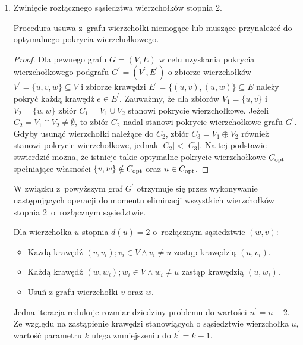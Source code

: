 \begin{enumerate}
  \item Zwinięcie rozłącznego sąsiedztwa wierzchołków stopnia 2.
    \begin{theorem}
      Procedura usuwa z~grafu wierzchołki niemogące lub muszące przynależeć do 
      optymalnego pokrycia wierzchołkowego.
    \end{theorem}
    \begin{proof}
      Dla pewnego grafu $G=(V,E)$ w celu uzyskania pokrycia wierzchołkowego podgrafu $G^\prime=(V^\prime,E^\prime)$ o zbiorze wierzchołków $V^\prime=\{u, v, w\} \subseteq V$ i zbiorze krawędzi $E^\prime=\{(u,v), (u,w)\} \subseteq E$ należy pokryć każdą krawędź $e \in E^\prime$. 
      Zauważmy, że dla zbiorów $V_1=\{u,v\}$ i $V_2=\{u,w\}$ zbiór $C_1=V_1 \cup V_2$ stanowi pokrycie wierzchołkowe.
      Jeżeli $C_2=V_1 \cap V_2 \neq \emptyset$, to zbiór $C_2$ nadal stanowi pokrycie wierzchołkowe grafu $G^\prime$.
      Gdyby usunąć wierzchołki należące do $C_2$, zbiór $C_3=V_1 \oplus V_2$ również stanowi pokrycie wierzchołkowe, jednak $|C_2| < |C_3|$.
      Na tej podstawie stwierdzić można, że istnieje takie optymalne pokrycie wierzchołkowe $C_{\textnormal{opt}}$ spełniające własności $\{v,w\} \notin C_{\textnormal{opt}}$ oraz $u \in C_{\textnormal{opt}}$.
    \end{proof}

    W związku z~powyższym graf $G^\prime$ otrzymuje się przez wykonywanie
    następujących operacji do momentu eliminacji wszystkich wierzchołków stopnia
    2\ o~rozłącznym sąsiedztwie.

    Dla wierzchołka $u$ stopnia $d(u)=2$ o~rozłącznym sąsiedztwie $(w,v)$:
    \begin{itemize}
      \item Każdą krawędź $(v,v_i); v_i \in V \land v_i \neq u$ zastąp 
        krawędzią $(u, v_i)$.
      \item Każdą krawędź $(w,w_i); w_i \in V \land w_i \neq u$ zastąp
        krawędzią $(u, w_i)$.
      \item Usuń z grafu wierzchołki $v$ oraz $w$.
    \end{itemize}
    Jedna iteracja redukuje rozmiar dziedziny problemu do wartości
    $n^\prime=n-2$.
    Ze względu na zastąpienie krawędzi stanowiących o sąsiedztwie wierzchołka $u$,
    wartość parametru $k$ ulega zmniejszeniu do $k^\prime=k-1$.

\end{enumerate}

